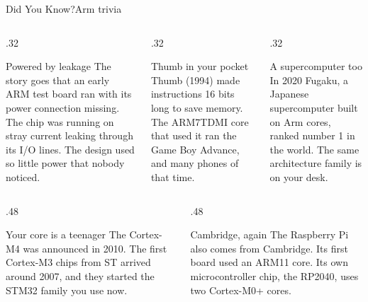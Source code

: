 \documentclass[9pt,aspectratio=169,xcolor=table]{beamer}
\begin{document}
{\beamerextras
\begin{frame}{Did You Know?}{Arm trivia}
    \begin{columns}[T]
    \begin{column}{.32\textwidth}
        \begin{block}{Powered by leakage}
            {\small The story goes that an early ARM test board ran with its power connection missing. The chip was running on stray current leaking through its I/O lines. The design used so little power that nobody noticed.}
        \end{block}
    \end{column}
    \begin{column}{.32\textwidth}
        \begin{block}{Thumb in your pocket}
            {\small Thumb (1994) made instructions 16 bits long to save memory. The ARM7TDMI core that used it ran the Game Boy Advance, and many phones of that time.}
        \end{block}
    \end{column}
    \begin{column}{.32\textwidth}
        \begin{block}{A supercomputer too}
            {\small In 2020 Fugaku, a Japanese supercomputer built on Arm cores, ranked \alert{number 1} in the world. The same architecture family is on your desk.}
        \end{block}
    \end{column}
    \end{columns}

    \vspace{3mm}
    \begin{columns}[T]
    \begin{column}{.48\textwidth}
        \begin{block}{Your core is a teenager}
            {\small The Cortex-M4 was announced in 2010. The first Cortex-M3 chips from ST arrived around 2007, and they started the STM32 family you use now.}
        \end{block}
    \end{column}
    \begin{column}{.48\textwidth}
        \begin{block}{Cambridge, again}
            {\small The Raspberry Pi also comes from Cambridge. Its first board used an ARM11 core. Its own microcontroller chip, the RP2040, uses two Cortex-M0+ cores.}
        \end{block}
    \end{column}
    \end{columns}
\end{frame}
}
\end{document}
